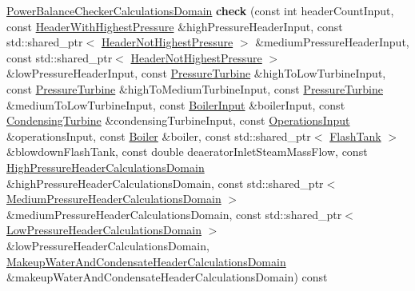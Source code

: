 \begin{DoxyCompactItemize}
\item 
\mbox{\label{class_power_balance_checker_a05c90282b9728b9c8d647ad0857861c6}} 
\hyperlink{class_power_balance_checker_calculations_domain}{Power\+Balance\+Checker\+Calculations\+Domain} {\bfseries check} (const int header\+Count\+Input, const \hyperlink{class_header_with_highest_pressure}{Header\+With\+Highest\+Pressure} \&high\+Pressure\+Header\+Input, const std\+::shared\+\_\+ptr$<$ \hyperlink{class_header_not_highest_pressure}{Header\+Not\+Highest\+Pressure} $>$ \&medium\+Pressure\+Header\+Input, const std\+::shared\+\_\+ptr$<$ \hyperlink{class_header_not_highest_pressure}{Header\+Not\+Highest\+Pressure} $>$ \&low\+Pressure\+Header\+Input, const \hyperlink{class_pressure_turbine}{Pressure\+Turbine} \&high\+To\+Low\+Turbine\+Input, const \hyperlink{class_pressure_turbine}{Pressure\+Turbine} \&high\+To\+Medium\+Turbine\+Input, const \hyperlink{class_pressure_turbine}{Pressure\+Turbine} \&medium\+To\+Low\+Turbine\+Input, const \hyperlink{class_boiler_input}{Boiler\+Input} \&boiler\+Input, const \hyperlink{class_condensing_turbine}{Condensing\+Turbine} \&condensing\+Turbine\+Input, const \hyperlink{class_operations_input}{Operations\+Input} \&operations\+Input, const \hyperlink{class_boiler}{Boiler} \&boiler, const std\+::shared\+\_\+ptr$<$ \hyperlink{class_flash_tank}{Flash\+Tank} $>$ \&blowdown\+Flash\+Tank, const double deaerator\+Inlet\+Steam\+Mass\+Flow, const \hyperlink{class_high_pressure_header_calculations_domain}{High\+Pressure\+Header\+Calculations\+Domain} \&high\+Pressure\+Header\+Calculations\+Domain, const std\+::shared\+\_\+ptr$<$ \hyperlink{class_medium_pressure_header_calculations_domain}{Medium\+Pressure\+Header\+Calculations\+Domain} $>$ \&medium\+Pressure\+Header\+Calculations\+Domain, const std\+::shared\+\_\+ptr$<$ \hyperlink{class_low_pressure_header_calculations_domain}{Low\+Pressure\+Header\+Calculations\+Domain} $>$ \&low\+Pressure\+Header\+Calculations\+Domain, \hyperlink{class_makeup_water_and_condensate_header_calculations_domain}{Makeup\+Water\+And\+Condensate\+Header\+Calculations\+Domain} \&makeup\+Water\+And\+Condensate\+Header\+Calculations\+Domain) const
\item 
\mbox{\label{class_power_balance_checker_a05c90282b9728b9c8d647ad0857861c6}} 

\end{DoxyCompactItemize}
